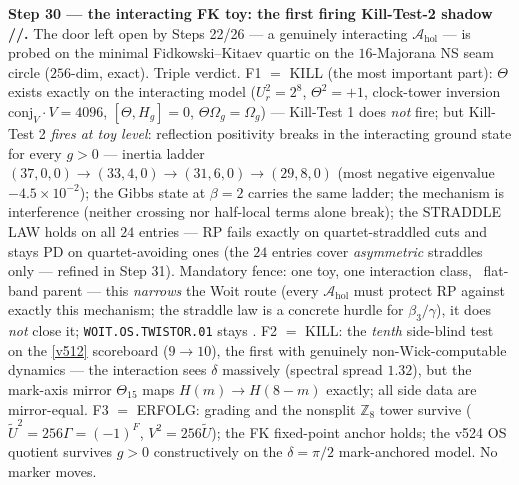 \documentclass[11pt,a4paper]{article}
\newcommand{\Z}{\mathbb{Z}}
\theoremstyle{definition}
\begin{document}
\par\smallskip\noindent\textbf{Step 30 --- the interacting FK toy: the first firing
Kill-Test-2 shadow \mE/\mC/\mO.} The door left open by Steps 22/26 --- a genuinely
interacting $\mathcal A_{\mathrm{hol}}$ --- is probed on the minimal Fidkowski--Kitaev
quartic on the $16$-Majorana NS seam circle ($256$-dim, exact). Triple verdict. F1 $=$
KILL (the most important part): $\Theta$ exists exactly on the interacting model
($U_r^2=2^8$, $\Theta^2=+1$, clock-tower inversion $\mathrm{conj}_V\cdot V=4096$,
$[\Theta,H_g]=0$, $\Theta\Omega_g=\Omega_g$) --- Kill-Test 1 does \emph{not} fire; but
Kill-Test 2 \emph{fires at toy level}: reflection positivity breaks in the interacting
ground state for every $g>0$ --- inertia ladder $(37,0,0)\to(33,4,0)\to(31,6,0)\to
(29,8,0)$ (most negative eigenvalue $-4.5\times10^{-2}$); the Gibbs state at $\beta=2$
carries the same ladder; the mechanism is interference (neither crossing nor half-local
terms alone break); the STRADDLE LAW holds on all $24$ entries --- RP fails exactly on
quartet-straddled cuts and stays PD on quartet-avoiding ones (the $24$ entries cover
\emph{asymmetric} straddles only --- refined in Step 31). Mandatory fence: one toy,
one interaction class, \mC\ flat-band parent --- this \emph{narrows} the Woit route
(every $\mathcal A_{\mathrm{hol}}$ must protect RP against exactly this mechanism; the
straddle law is a concrete hurdle for $\beta_3/\gamma$), it does \emph{not} close it;
\texttt{WOIT.OS.TWISTOR.01} stays \mO. F2 $=$ KILL: the \emph{tenth} side-blind test on
the \vref{v512} scoreboard ($9\to10$), the first with genuinely non-Wick-computable
dynamics --- the interaction sees $\delta$ massively (spectral spread $1.32$), but the
mark-axis mirror $\Theta_{15}$ maps $H(m)\to H(8-m)$ exactly; all side data are
mirror-equal. F3 $=$ ERFOLG: grading and the nonsplit $\Z_8$ tower survive
($\tilde U^2=256\Gamma=(-1)^F$, $V^2=256\tilde U$); the FK fixed-point anchor holds; the
v524 OS quotient survives $g>0$ constructively on the $\delta=\pi/2$ mark-anchored model.
No marker moves.
\end{document}
